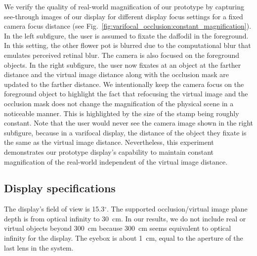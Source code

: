 We verify the quality of real-world magnification of our prototype by capturing see-through images of our display for different display focus settings for a fixed camera focus distance (see Fig.~\ref{fig:varifocal_occlusion:constant_magnification}). In the left subfigure, the user is assumed to fixate the  daffodil in the foreground. In this setting, the other flower pot is blurred due to the computational blur that emulates perceived retinal blur. The camera is also focused on the foreground objects. In the right subfigure, the user now fixates at an object at the farther distance and the virtual image distance along with the occlusion mask are updated to the farther distance. We intentionally keep the camera focus on the foreground object to highlight the fact that refocusing the virtual image and the occlusion mask does not change the magnification of the physical scene in a noticeable manner. This is highlighted by the size of the stamp being roughly constant. Note that the user would never see the camera image shown in the right subfigure, because in a varifocal display, the distance of the object they fixate is the same as the virtual image distance. Nevertheless, this experiment demonstrates our prototype display's capability to maintain constant magnification of the real-world independent of the virtual image distance.



\subsection{Display specifications}
The display's field of view is 15.3$^\circ$. The supported occlusion/virtual image plane depth is from optical infinity to 30~cm. In our results, we do not include real or virtual objects beyond 300~cm because 300~cm seems equivalent to optical infinity for the display. The eyebox is about 1~cm, equal to the aperture of the last lens in the system. 
